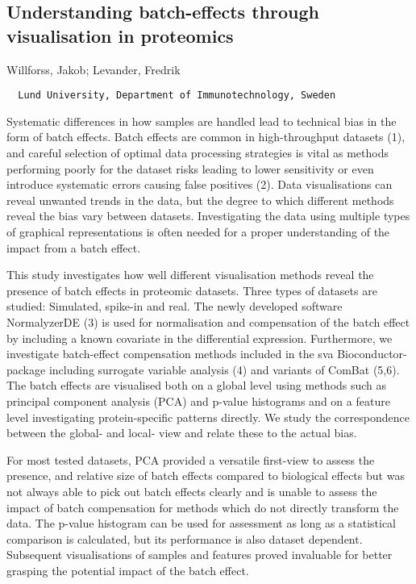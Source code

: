 {\subsection*{\color{eubicRed} Understanding batch-effects through visualisation in proteomics}
{\color{eubicGray}Willforss, Jakob;
Levander, Fredrik}
{\color{eubicGray}\begin{verbatim}
  Lund University, Department of Immunotechnology, Sweden
\end{verbatim}}

Systematic differences in how samples are handled lead to technical bias in the form of batch effects. Batch effects are common in high-throughput datasets (1), and careful selection of optimal data processing strategies is vital as methods performing poorly for the dataset risks leading to lower sensitivity or even introduce systematic errors causing false positives (2). Data visualisations can reveal unwanted trends in the data, but the degree to which different methods reveal the bias vary between datasets. Investigating the data using multiple types of graphical representations is often needed for a proper understanding of the impact from a batch effect.

This study investigates how well different visualisation methods reveal the presence of batch effects in proteomic datasets. Three types of datasets are studied: Simulated, spike-in and real. The newly developed software NormalyzerDE (3) is used for normalisation and compensation of the batch effect by including a known covariate in the differential expression. Furthermore, we investigate batch-effect compensation methods included in the sva Bioconductor-package including surrogate variable analysis (4) and variants of ComBat (5,6). The batch effects are visualised both on a global level using methods such as principal component analysis (PCA) and p-value histograms and on a feature level investigating protein-specific patterns directly. We study the correspondence between the global- and local- view and relate these to the actual bias.

For most tested datasets, PCA provided a versatile first-view to assess the presence, and relative size of batch effects compared to biological effects but was not always able to pick out batch effects clearly and is unable to assess the impact of batch compensation for methods which do not directly transform the data. The p-value histogram can be used for assessment as long as a statistical comparison is calculated, but its performance is also dataset dependent. Subsequent visualisations of samples and features proved invaluable for better grasping the potential impact of the batch effect.

}
